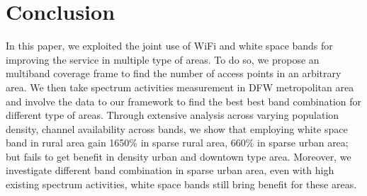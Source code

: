 \section{Conclusion}
\label{sec:conclusion}
In this paper, we exploited the joint use of WiFi and white space bands for 
improving the service in multiple type of areas.  To do so, we
propose an multiband coverage frame to find the number of access points in an arbitrary area.
 We then take spectrum activities measurement in DFW metropolitan area and involve the data to 
 our framework to find the best best band combination for different type of areas. Through 
extensive analysis across varying population density, channel availability across bands, 
we show that employing white space band in rural area gain 1650\% in sparse rural area, 
660\% in sparse urban area; but fails to get benefit in density urban and downtown type area.
Moreover, we investigate different band combination in sparse urban area, even with high existing
spectrum activities, white space bands still bring benefit for these areas.


